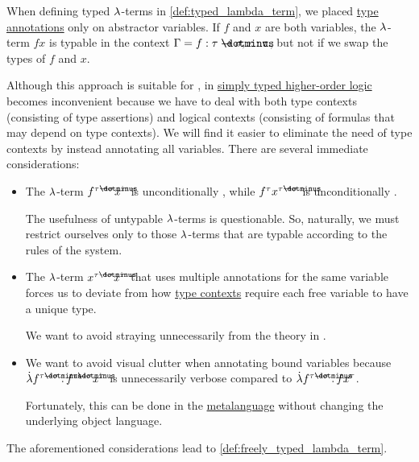\begin{remark}\label{rem:simply_typed_hol_type_annotations}
  When defining typed \( {\mathrm \lambda} \)-terms in \cref{def:typed_lambda_term}, we placed \hyperref[con:type_annotation]{type annotations} only on abstractor variables. If \( f \) and \( x \) are both variables, the \( {\mathrm \lambda} \)-term \( fx \) is typable in the context \( \Gamma = f: \tau \synimplies \sigma, x: \tau \), but not if we swap the types of \( f \) and \( x \).

  Although this approach is suitable for , in \hyperref[def:simply_typed_hol]{simply typed higher-order logic} becomes inconvenient because we have to deal with both type contexts (consisting of type assertions) and logical contexts (consisting of formulas that may depend on type contexts). We will find it easier to eliminate the need of type contexts by instead annotating all variables. There are several immediate considerations:
  \begin{itemize}
    \item The \( {\mathrm \lambda} \)-term \( f^{\tau \synimplies \sigma} x^\tau \) is unconditionally \hyperref[def:typability]{}, while \( f^\tau x^{\tau \synimplies \sigma} \) is unconditionally .

    The usefulness of untypable \( {\mathrm \lambda} \)-terms is questionable. So, naturally, we must restrict ourselves only to those \( {\mathrm \lambda} \)-terms that are typable according to the rules of the system.

    \item The \( {\mathrm \lambda} \)-term \( x^{\tau \synimplies \sigma} x^\tau \) that uses multiple annotations for the same variable forces us to deviate from how \hyperref[def:type_context]{type contexts} require each free variable to have a unique type.

    We want to avoid straying unnecessarily from the theory in .

    \item We want to avoid visual clutter when annotating bound variables because \( \qabs {f^{\tau \synimplies \sigma}} f^{\tau \synimplies \sigma} x^\tau \) is unnecessarily verbose compared to \( \qabs {f^{\tau \synimplies \sigma}} f x^\tau \).

    Fortunately, this can be done in the \hyperref[con:metalingual_abbreviation]{metalanguage} without changing the underlying object language.
  \end{itemize}

  The aforementioned considerations lead to \cref{def:freely_typed_lambda_term}.
\end{remark}

